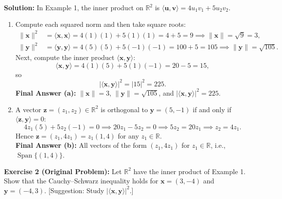 \documentclass[11pt, letterpaper]{article}
\theoremstyle{definition}
\theoremstyle{remark}
\begin{document}
\textbf{Solution:}
In Example 1, the inner product on $\mathbb{R}^2$ is $\langle \mathbf{u}, \mathbf{v} \rangle = 4u_1 v_1 + 5u_2 v_2$.
\begin{enumerate}[label=\textbf{\alph*.}]
    \item Compute each squared norm and then take square roots:
    \begin{align*}
        \|\mathbf{x}\|^2 &= \langle \mathbf{x}, \mathbf{x} \rangle = 4(1)(1) + 5(1)(1) = 4 + 5 = 9 \implies \|\mathbf{x}\| = \sqrt{9} = 3, \\
        \|\mathbf{y}\|^2 &= \langle \mathbf{y}, \mathbf{y} \rangle = 4(5)(5) + 5(-1)(-1) = 100 + 5 = 105 \implies \|\mathbf{y}\| = \sqrt{105}.
    \end{align*}
    Next, compute the inner product $\langle \mathbf{x}, \mathbf{y} \rangle$:
    \[
        \langle \mathbf{x}, \mathbf{y} \rangle = 4(1)(5) + 5(1)(-1) = 20 - 5 = 15,
    \]
    so
    \[
        |\langle \mathbf{x}, \mathbf{y} \rangle|^2 = |15|^2 = 225.
    \]
    \textbf{Final Answer (a):} $\|\mathbf{x}\| = 3$, $\|\mathbf{y}\| = \sqrt{105}$, and $|\langle \mathbf{x}, \mathbf{y} \rangle|^2 = 225$.

    \item A vector $\mathbf{z} = (z_1, z_2) \in \mathbb{R}^2$ is orthogonal to $\mathbf{y} = (5, -1)$ if and only if $\langle \mathbf{z}, \mathbf{y} \rangle = 0$:
    \[
        4z_1(5) + 5z_2(-1) = 0 \implies 20z_1 - 5z_2 = 0 \implies 5z_2 = 20z_1 \implies z_2 = 4z_1.
    \]
    Hence $\mathbf{z} = (z_1, 4z_1) = z_1(1, 4)$ for any $z_1 \in \mathbb{R}$.\\
    \textbf{Final Answer (b):} All vectors of the form $(z_1, 4z_1)$ for $z_1 \in \mathbb{R}$, i.e., $\operatorname{Span}\{(1, 4)\}$.
\end{enumerate}

\textbf{Exercise 2 (Original Problem):} Let $\mathbb{R}^2$ have the inner product of Example 1. Show that the Cauchy--Schwarz inequality holds for $\mathbf{x} = (3, -4)$ and $\mathbf{y} = (-4, 3)$. [Suggestion: Study $|\langle \mathbf{x}, \mathbf{y} \rangle|^2$.]
\end{document}
